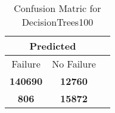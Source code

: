 \begin{table}[] 
\caption{Confusion Matric for DecisionTrees100} 
\label{Table: Prediction Accuracy-NoneDecisionTrees10090.0EKF-ignoreReflection-Reflection} 
\centering 
\begin{tabular} 
 {@{}ccc@{}} 
\toprule 
\multicolumn{2}{c}{\textbf{Predicted}}
 \\ \midrule 
\multicolumn{1}{|c|}{Failure} & 
\multicolumn{1}{c|}{No Failure}
 \\ \midrule 
\multicolumn{1}{|c|}{\color{green}\textbf{140690}} & 
\multicolumn{1}{c|}{\color{red}\textbf{12760}}
 \\ \midrule 
\multicolumn{1}{|c|}{\color{red}\textbf{806}} & 
\multicolumn{1}{c|}{\color{green}\textbf{15872}}
 \\ \bottomrule 
\end{tabular} 
\end{table} 
